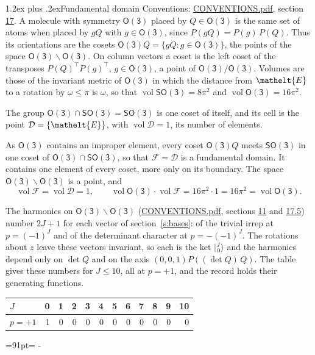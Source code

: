\documentclass[10pt,a4paper]{article}
\makeatletter
\renewcommand\section{\@startsection{section}{1}{\z@}{-3ex plus -1ex minus -.2ex}%
  {1.2ex plus .2ex}{\normalfont\large\sffamily\bfseries\color{parttitle}}}
\newcommand{\needspace}[1]{\par\penalty-100\begingroup\dimen0=#1\relax\dimen2=\pagegoal
  \advance\dimen2-\pagetotal\ifdim\dimen0>\dimen2\relax\ifdim\dimen2>0pt\vfil\break\fi\fi
  \endgroup}
\numberwithin{equation}{section}
\newcommand{\eltfont}[1]{{\let\sigma\eltsigma\mathelt{#1}}}
\newcommand{\grp}[1]{\mathsf{#1}}
\newcommand{\elt}[1]{\eltfont{#1}}
\newcommand{\dirvec}[3]{(#1, #2, #3)}
\newcommand{\jm}[2]{\bigl\lvert{}^{#1}_{\,#2}\bigr\rangle}
\newcommand{\vol}{\operatorname{vol}}
\newcommand{\fcell}{\mathcal{D}}
\newcommand{\fdomain}{\mathcal{F}}
\makeatother
\begin{document}
\section{Fundamental domain}\label{s:fundamental_domain}
Conventions: \href{../../CONVENTIONS.pdf}{CONVENTIONS.pdf}, section \href{../../CONVENTIONS.pdf\#conv.17}{17}.
\leavevmode\label{n:element.placement}A molecule with symmetry $\grp{O(3)}$ placed by $Q \in \grp{O(3)}$ is the same set of atoms when placed by $gQ$ with $g \in \grp{O(3)}$, since $P(gQ) = P(g)\,P(Q)$. \label{n:operator.cosets}Thus its orientations are the cosets $\grp{O(3)}Q = \{gQ : g \in \grp{O(3)}\}$, the points of the space $\grp{O(3)}\backslash\grp{O(3)}$. On column vectors a coset is the left coset of the transposes $P(Q)^{\top}P(g)^{\top}$, $g \in \grp{O(3)}$, a point of $\grp{O(3)}/\grp{O(3)}$.
\leavevmode\label{n:operator.volume}Volumes are those of the invariant metric of $\grp{O(3)}$ in which the distance from $\elt{E}$ to a rotation by $\omega \le \pi$ is $\omega$, so that $\vol\grp{SO(3)} = 8\pi^2$ and $\vol\grp{O(3)} = 16\pi^2$.

\leavevmode\label{n:set.cell}The group $\grp{O(3)} \cap \grp{SO(3)} = \grp{SO(3)}$ is one coset of itself, and its cell is the point $\fcell = \{\elt{E}\}$, with $\vol\fcell = 1$, its number of elements.

\leavevmode\label{n:set.fundamental}As $\grp{O(3)}$ contains an improper element, every coset $\grp{O(3)}Q$ meets \href{SO3.pdf}{$\grp{SO(3)}$} in one coset of $\grp{O(3)} \cap \grp{SO(3)}$, so that $\fdomain = \fcell$ is a fundamental domain. It contains one element of every coset, more only on its boundary.
The space $\grp{O(3)}\backslash\grp{O(3)}$ is a point, and
\begin{equation}\label{e:volume}\vol\fdomain = \vol\fcell = 1,\qquad \vol\grp{O(3)}\cdot\vol\fdomain = 16\pi^2\cdot 1 = 16\pi^2 = \vol\grp{O(3)}.\end{equation}

The harmonics on $\grp{O(3)}\backslash\grp{O(3)}$ (\href{../../CONVENTIONS.pdf}{CONVENTIONS.pdf}, sections \href{../../CONVENTIONS.pdf\#conv.11}{11} and \href{../../CONVENTIONS.pdf\#conv.17.5}{17.5}) number $2J + 1$ for each vector of section~\ref{s:bases}: of the trivial irrep at $p = (-1)^J$ and of the determinant character at $p = -(-1)^J$. The rotations about $z$ leave these vectors invariant, so each is the ket $\jm{J}{0}$ and the harmonics depend only on $\det Q$ and on the axis $\dirvec{0}{0}{1}P((\det Q)\,Q)$. The table gives these numbers for $J \le 10$, all at $p = +1$, and the record holds their generating functions.
{\small\setlength{\tabcolsep}{4pt}\begin{longtable}{@{}lrrrrrrrrrrr@{}}\toprule
$J$ & 0 & 1 & 2 & 3 & 4 & 5 & 6 & 7 & 8 & 9 & 10\\\midrule\endhead
\bottomrule\endfoot\endlastfoot
$p = +1$ & 1 & 0 & 0 & 0 & 0 & 0 & 0 & 0 & 0 & 0 & 0\\
\bottomrule\end{longtable}}
\needspace{91pt}
\end{document}
